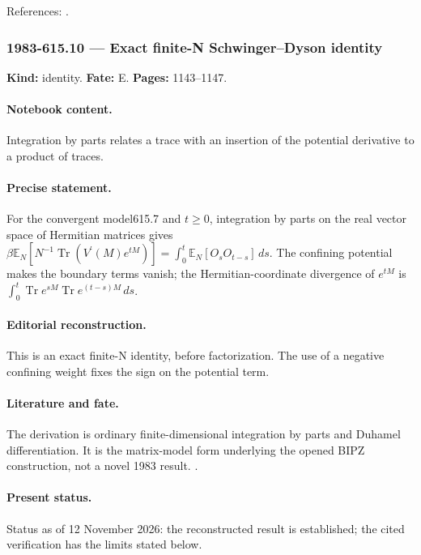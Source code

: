 \noindent References: \citep{makeenko2000large}.\par

\subsubsection{1983-615.10 --- Exact finite-N Schwinger--Dyson identity}

\label{item:1983-615.10}

\noindent\textbf{Kind:} identity. \textbf{Fate:} E. \textbf{Pages:} 1143--1147.\par

\paragraph{Notebook content.} Integration by parts relates a trace with an insertion of the potential derivative to a product of traces.

\paragraph{Precise statement.} For the convergent model615.7 and $t\ge0$, integration by parts on the real vector space of Hermitian matrices gives $\beta\mathbb E_N[N^{-1}\operatorname{Tr}(V^{\prime}(M)e^{tM})]=\int_0^t\mathbb E_N[O_sO_{t-s}]\,ds$. The confining potential makes the boundary terms vanish; the Hermitian-coordinate divergence of $e^{tM}$ is $\int_0^t\operatorname{Tr}e^{sM}\operatorname{Tr}e^{(t-s)M}\,ds$.

\paragraph{Editorial reconstruction.} This is an exact finite-N identity, before factorization. The use of a negative confining weight fixes the sign on the potential term.

\paragraph{Literature and fate.} The derivation is ordinary finite-dimensional integration by parts and Duhamel differentiation. It is the matrix-model form underlying the opened BIPZ construction, not a novel 1983 result. \citep{brezinitzyksonparisizuber1978planar}.

\paragraph{Present status.} Status as of 12 November 2026: the reconstructed result is established; the cited verification has the limits stated below.

